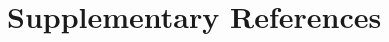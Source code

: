 \documentclass[a4paper, 12pt]{article}
\begin{document}



\newpage
\section{Supplementary References}
 


\end{document}
